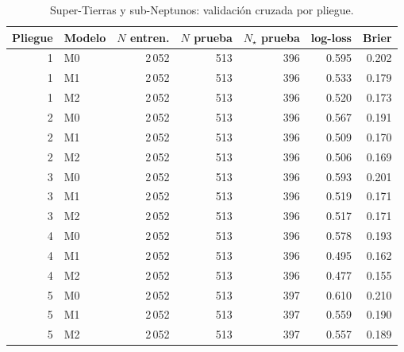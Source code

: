 \begin{table}[htbp]
    \centering
    \caption{Super-Tierras y sub-Neptunos: validación cruzada por pliegue.}
    \label{tab:Z-T10}
    \small
    \begin{tabular}{rlrrrrr}
    \toprule
    Pliegue & Modelo & $N$ entren. & $N$ prueba & $N_\star$ prueba & log-loss & Brier \\
    \midrule
    1 & M0 & 2\,052 & 513 & 396 & 0.595 & 0.202 \\
    1 & M1 & 2\,052 & 513 & 396 & 0.533 & 0.179 \\
    1 & M2 & 2\,052 & 513 & 396 & 0.520 & 0.173 \\
    2 & M0 & 2\,052 & 513 & 396 & 0.567 & 0.191 \\
    2 & M1 & 2\,052 & 513 & 396 & 0.509 & 0.170 \\
    2 & M2 & 2\,052 & 513 & 396 & 0.506 & 0.169 \\
    3 & M0 & 2\,052 & 513 & 396 & 0.593 & 0.201 \\
    3 & M1 & 2\,052 & 513 & 396 & 0.519 & 0.171 \\
    3 & M2 & 2\,052 & 513 & 396 & 0.517 & 0.171 \\
    4 & M0 & 2\,052 & 513 & 396 & 0.578 & 0.193 \\
    4 & M1 & 2\,052 & 513 & 396 & 0.495 & 0.162 \\
    4 & M2 & 2\,052 & 513 & 396 & 0.477 & 0.155 \\
    5 & M0 & 2\,052 & 513 & 397 & 0.610 & 0.210 \\
    5 & M1 & 2\,052 & 513 & 397 & 0.559 & 0.190 \\
    5 & M2 & 2\,052 & 513 & 397 & 0.557 & 0.189 \\
    \bottomrule
    \end{tabular}
\end{table}
